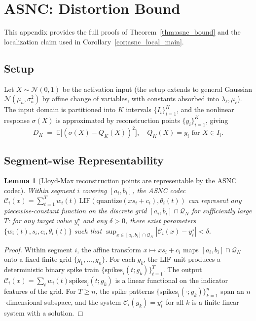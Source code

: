 \documentclass{article}
\theoremstyle{plain}
\newtheorem{lemma}[theorem]{Lemma}
\theoremstyle{definition}
\theoremstyle{remark}
\begin{document}
\section{ASNC: Distortion Bound}
\label{app:asnc_proof}

This appendix provides the full proofs of Theorem~\ref{thm:asnc_bound} and the
localization claim used in Corollary~\ref{cor:asnc_local_main}.

\subsection{Setup}

Let $X \sim \mathcal{N}(0,1)$ be the activation input (the setup extends to
general Gaussian $\mathcal{N}(\mu_a,\sigma_a^2)$ by affine change of
variables, with constants absorbed into $\lambda_\ell,\mu_\ell$). The input
domain is partitioned into $K$ intervals $\{I_i\}_{i=1}^K$, and the nonlinear
response $\sigma(X)$ is approximated by reconstruction points
$\{y_i\}_{i=1}^K$, giving
\[
D_K \;=\; \mathbb{E}\big[(\sigma(X) - Q_K(X))^2\big],
\quad Q_K(X) = y_i \text{ for } X \in I_i.
\]

\subsection{Segment-wise Representability}
\label{app:codec_convergence}

\begin{lemma}[Lloyd-Max reconstruction points are representable by the ASNC codec]
\label{lem:codec_convergence}
Within segment $i$ covering $[a_i, b_i]$, the ASNC codec
$\mathcal{C}_i(x) = \sum_{t=1}^T w_i(t)\,\mathrm{LIF}(\mathrm{quantize}(xs_i +
c_i), \theta_i(t))$ can represent any piecewise-constant function on the
discrete grid $[a_i, b_i]\cap\mathcal{Q}_N$ for sufficiently large $T$: for
any target value $y_i^\star$ and any $\delta>0$, there exist parameters
$\{w_i(t), s_i, c_i, \theta_i(t)\}$ such that
$\sup_{x\in[a_i,b_i]\cap\mathcal{Q}_N} |\mathcal{C}_i(x) - y_i^\star| < \delta$.
\end{lemma}

\begin{proof}
Within segment $i$, the affine transform $x\mapsto xs_i + c_i$ maps
$[a_i,b_i]\cap\mathcal{Q}_N$ onto a fixed finite grid $\{g_1,\ldots,g_n\}$.
For each $g_k$, the LIF unit produces a deterministic binary spike train
$\{\mathrm{spikes}_i(t;g_k)\}_{t=1}^T$. The output
$\mathcal{C}_i(x) = \sum_t w_i(t)\mathrm{spikes}_i(t;g_k)$ is a linear
functional on the indicator features of the grid. For $T \ge n$, the spike
patterns $\{\mathrm{spikes}_i(\cdot;g_k)\}_{k=1}^n$ span an $n$-dimensional
subspace, and the system $\mathcal{C}_i(g_k) = y_i^\star$ for all $k$ is a
finite linear system with a solution.
\end{proof}
\end{document}
